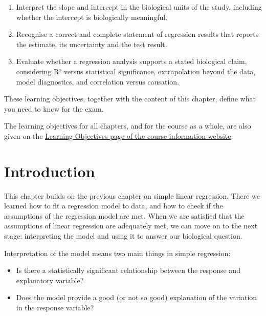 \documentclass[
  letterpaper,
  8pt,
  a4paper]{book}
\providecommand{\tightlist}{%
  \setlength{\itemsep}{0pt}\setlength{\parskip}{0pt}}
\begin{document}
\begin{tcolorbox}
\begin{enumerate}
  response, with its confidence interval or prediction interval, for a
  new value of the explanatory variable.
\item
  Interpret the slope and intercept in the biological units of the
  study, including whether the intercept is biologically meaningful.
\item
  Recognise a correct and complete statement of regression results that
  reports the estimate, its uncertainty and the test result.
\item
  Evaluate whether a regression analysis supports a stated biological
  claim, considering R² versus statistical significance, extrapolation
  beyond the data, model diagnostics, and correlation versus causation.
\end{enumerate}

These learning objectives, together with the content of this chapter,
define what you need to know for the exam.

The learning objectives for all chapters, and for the course as a whole,
are also given on the
\href{https://opetchey.github.io/BIO144_Course_Information/3.1-learning-objectives.html}{Learning
Objectives page of the course information website}.

\end{tcolorbox}

\section*{Introduction}\label{introduction-1}


This chapter builds on the previous chapter on simple linear regression.
There we learned how to fit a regression model to data, and how to check
if the assumptions of the regression model are met. When we are
satisfied that the assumptions of linear regression are adequately met,
we can move on to the next stage: interpreting the model and using it to
answer our biological question.

Interpretation of the model means two main things in simple regression:

\begin{itemize}
\tightlist
\item
  Is there a statistically significant relationship between the response
  and explanatory variable?
\item
  Does the model provide a good (or not so good) explanation of the
  variation in the response variable?
\end{itemize}
\end{document}
